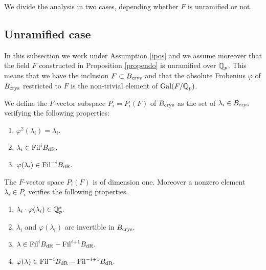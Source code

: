 \documentclass[11pt]{amsart}
\begin{document}
We   divide the analysis in two cases, depending  whether $F$ is unramified or not. 


\subsection*{Unramified case}

In this subsection we work under   Assumption  \ref{ipos} and we assume moreover that the field $F$  constructed in  Proposition \ref{propendo} is unramified over $\mathbb{Q}_p$.
This means that we have the inclusion $F \subset B_{\textnormal{crys}}$ and that the absolute Frobenius $\varphi$ of $B_{\textnormal{crys}}$  restricted to $F$ is the  non-trivial element of $\textnormal{Gal}(F/\mathbb{Q}_p)$.
\begin{definition}\label{defpi}
We define the $F$-vector subspace $P_i=P_i(F)$ of $B_{\textnormal{crys}}$ as the set of $\lambda_i \in B_{\textnormal{crys}}$ verifying the following properties:
\begin{enumerate}
\item $\varphi^2 (\lambda_i)= \lambda_i.$
\item $\lambda_i \in \textnormal{Fil} ^i B_{\mathrm{dR}}.$
\item $\varphi(\lambda_i) \in \textnormal{Fil} ^{-i} B_{\mathrm{dR}}.$
\end{enumerate}
\end{definition}


\begin{proposition}\label{lemmapi}
The $F$-vector space  $P_i(F)$ is of dimension one. Moreover a nonzero element $\lambda_i \in P_i$ verifies the following properties.
\begin{enumerate}
 \item\label{preciso1} $\lambda_i \cdot\varphi(\lambda_i) \in \mathbb{Q}^*_p.$
  \item\label{preciso4} $\lambda_i $ and $\varphi(\lambda_i)$ are invertible in $B_{\textnormal{crys}}.$
\item\label{preciso2} $\lambda \in \textnormal{Fil} ^i B_{\mathrm{dR}}-\textnormal{Fil} ^{i+1} B_{\mathrm{dR}}.$
\item\label{preciso3} $\varphi(\lambda) \in \textnormal{Fil} ^{-i} B_{\mathrm{dR}}-\textnormal{Fil} ^{-i+1} B_{\mathrm{dR}}.$
\end{enumerate}
\end{proposition}
\end{document}
